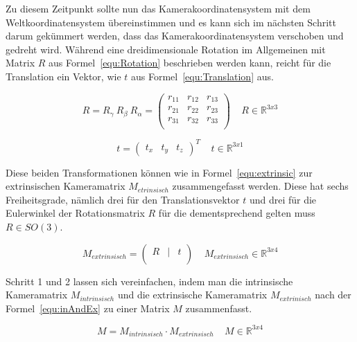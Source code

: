 Zu diesem Zeitpunkt sollte nun das Kamerakoordinatensystem mit dem Weltkoordinatensystem übereinstimmen und es kann sich im nächsten Schritt darum gekümmert werden, dass das Kamerakoordinatensystem verschoben und gedreht wird. Während eine dreidimensionale Rotation im Allgemeinen mit Matrix $R$ aus Formel~\ref{equ:Rotation} beschrieben werden kann, reicht für die Translation ein Vektor, wie $t$ aus Formel~\ref{equ:Translation} aus.\

\begin{equation}
\label{equ:Rotation}
R= R_\gamma ~R_\beta ~R_\alpha =
\begin{pmatrix}
r_{11} & r_{12} & r_{13} \\
r_{21} & r_{22} & r_{23} \\
r_{31} & r_{32} & r_{33} \\
\end{pmatrix}
~ ~ ~ ~ ~R \in \mathbb{R}^{3x3}
\end{equation}



\begin{equation}
\label{equ:Translation}
t=
\begin{pmatrix}
t_x & t_y & t_z
\end{pmatrix}^T
~ ~ ~ ~ ~t \in \mathbb{R}^{3x1} 
\end{equation}

Diese beiden Transformationen können wie in Formel~\ref{equ:extrinsic} zur extrinsischen Kameramatrix $M_{etrinsisch}$ zusammengefasst werden. Diese hat sechs Freiheitsgrade, nämlich drei für den Translationsvektor $t$ und drei für die Eulerwinkel der Rotationsmatrix $R$ für die dementsprechend gelten muss $R \in SO(3)$.

\begin{equation}
\label{equ:extrinsic}
M_{extrinsisch}= 
\begin{pmatrix}
R &|& t \\
\end{pmatrix} 
~ ~ ~ ~ ~M_{extrinsisch} \in \mathbb{R}^{3x4}
\end{equation}

Schritt 1 und 2 lassen sich vereinfachen, indem man die intrinsische Kameramatrix $M_{intrinsisch}$ und die extrinsische Kameramatrix $M_{extrinisch}$ nach der Formel~\ref{equ:inAndEx} zu einer Matrix $M$ zusammenfasst.

\begin{equation}
\label{equ:inAndEx}
M = M_{intrinsisch} \cdot M_{extrinsisch}~ ~ ~ ~ ~M\in \mathbb{R}^{3x4}
\end{equation}

